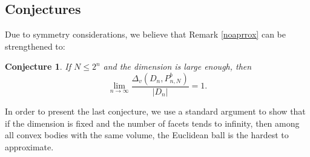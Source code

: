 \documentclass[10pt, twoside, leqno]{article}
\newtheorem{conj}[thm]{Conjecture}
\theoremstyle{definition}
\numberwithin{equation}{section}
\begin{document}
\subsection{Conjectures}\label{asymptoticresutls}
Due to symmetry considerations, we believe that Remark \ref{noaprrox} can be strengthened to:
\begin{conj}
	If $ N \leq 2^n$ and the dimension is large enough, then
	\[
		\lim_{n\to\infty} \frac{\Delta_v(D_n,P^b_{n,N})}{|D_n|} = 1.
	\]
\end{conj} 
In order to present the last conjecture, we use a standard argument to show that if the dimension is fixed and the number of facets tends to infinity, then among all convex bodies with the same volume, the Euclidean ball is the hardest to approximate. 
\end{document}
